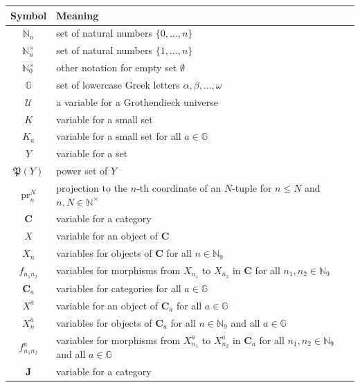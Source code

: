 \begin{longtable}{cl}
  \hline
  Symbol
  &
  Meaning
  \\
  \hline
  \endhead
  \hline
  \endfoot
  $\mathbb{N}_{n}$
  &
  set of natural numbers $\lbrace 0,\ldots,n \rbrace$
  \\[5pt]
  $\mathbb{N}_{n}^{\times}$
  &
  set of natural numbers $\lbrace 1,\ldots,n \rbrace$
  \\[5pt]
  $\mathbb{N}_{0}^{\times}$
  &
  other notation for empty set $\emptyset$
  \\[5pt]
  $\mathbb{G}$
  &
  set of lowercase Greek letters $\alpha,\beta,\ldots,\omega$
  \\[5pt]
  $\mathcal{U}$
  &
  a variable for a Grothendieck universe
  \\[5pt]
  $K$
  &
  variable for a small set
  \\[5pt]
  $K_{a}$
  &
  variable for a small set for all $a \in \mathbb{G}$
  \\[5pt]
  $Y$
  &
  variable for a set
  \\[5pt]
  $\mathfrak{P}(Y)$
  &
  power set of $Y$
  \\[5pt]
  $\mathrm{pr}_{n}^{N}$
  &
  projection to the $n$-th coordinate of an $N$-tuple
  for $n \leq N$ and $n,N \in \mathbb{N}^{\times}$
  \\[5pt]
  $\mathbf{C}$
  &
  variable for a category
  \\[5pt]
  $X$
  &
  variable for an object of $\mathbf{C}$
  \\[5pt]
  $X_{n}$
  &
  variables for objects of $\mathbf{C}$ for all $n \in \mathbb{N}_{9}$
  \\[5pt]
  $f_{n_{1}n_{2}}$
  &
  variables for morphisms from $X_{n_{1}}$ to $X_{n_{2}}$ in
  $\mathbf{C}$ for all $n_{1},n_{2} \in \mathbb{N}_{9}$
  \\[5pt]
  $\mathbf{C}_{a}$
  &
  variables for categories for all $a \in \mathbb{G}$
  \\[5pt]
  $X^{a}$
  &
  variable for an object of $\mathbf{C}_{a}$ for all $a \in \mathbb{G}$
  \\[5pt]
  $X_{n}^{a}$
  &
  variables for objects of $\mathbf{C}_{a}$
  for all $n \in \mathbb{N}_{9}$ and all $a \in \mathbb{G}$
  \\[5pt]
  $f_{n_{1}n_{2}}^{a}$
  &
  variables for morphisms from $X_{n_{1}}^{a}$ to $X_{n_{2}}^{a}$
  in $\mathbf{C}_{a}$
  for all $n_{1},n_{2} \in \mathbb{N}_{9}$ and all $a \in \mathbb{G}$
  \\[5pt]
  $\mathbf{J}$
  &
  variable for a category

\end{longtable}
